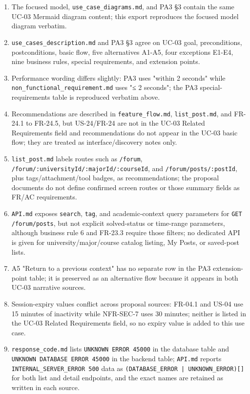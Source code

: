\documentclass[12pt]{article}
\begin{document}
\begin{enumerate}
\item The focused model, \texttt{use\_case\_diagrams.md}, and PA3 §3 contain the same UC-03 Mermaid diagram content; this export reproduces the focused model diagram verbatim.
\item \texttt{use\_cases\_description.md} and PA3 §3 agree on UC-03 goal, preconditions, postconditions, basic flow, five alternatives A1-A5, four exceptions E1-E4, nine business rules, special requirements, and extension points.
\item Performance wording differs slightly: PA3 uses "within 2 seconds" while \texttt{non\_functional\_requirement.md} uses "≤ 2 seconds"; the PA3 special-requirements table is reproduced verbatim above.
\item Recommendations are described in \texttt{feature\_flow.md}, \texttt{list\_post.md}, and FR-24.1 to FR-24.5, but US-24/FR-24 are not in the UC-03 Related Requirements field and recommendations do not appear in the UC-03 basic flow; they are treated as interface/discovery notes only.
\item \texttt{list\_post.md} labels routes such as \texttt{/forum}, \texttt{/forum/:universityId/:majorId/:courseId}, and \texttt{/forum/posts/:postId}, plus tags/attachment/tool badges, as recommendations; the proposal documents do not define confirmed screen routes or those summary fields as FR/AC requirements.
\item \texttt{API.md} exposes \texttt{search}, \texttt{tag}, and academic-context query parameters for \texttt{GET /forum/posts}, but not explicit solved-status or time-range parameters, although business rule 6 and FR-23.3 require those filters; no dedicated API is given for university/major/course catalog listing, My Posts, or saved-post lists.
\item A5 "Return to a previous context" has no separate row in the PA3 extension-point table; it is preserved as an alternative flow because it appears in both UC-03 narrative sources.
\item Session-expiry values conflict across proposal sources: FR-04.1 and US-04 use 15 minutes of inactivity while NFR-SEC-7 uses 30 minutes; neither is listed in the UC-03 Related Requirements field, so no expiry value is added to this use case.
\item \texttt{response\_code.md} lists \texttt{UNKNOWN ERROR 45000} in the database table and \texttt{UNKNOWN DATABASE ERROR 45000} in the backend table; \texttt{API.md} reports \texttt{INTERNAL\_SERVER\_ERROR 500} data as \texttt{(DATABASE\_ERROR | UNKNOWN\_ERROR)[]} for both list and detail endpoints, and the exact names are retained as written in each source.
\end{enumerate}
\par\medskip
\end{document}
